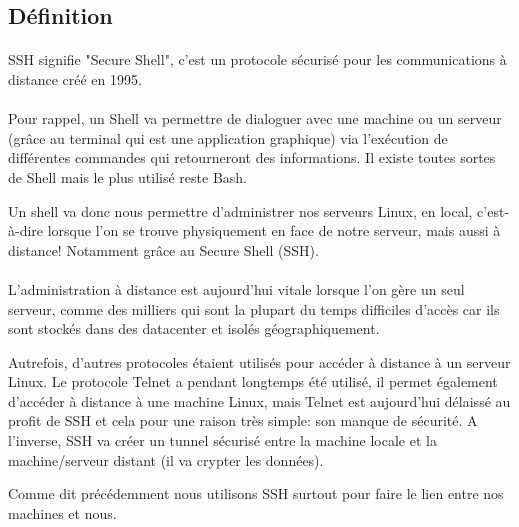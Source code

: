 \subsection{Définition}

\paragraph{} SSH signifie "Secure Shell", c'est un protocole sécurisé pour les
communications à distance créé en 1995.

\paragraph{} Pour rappel, un Shell va permettre de dialoguer avec une machine
ou un serveur (grâce au terminal qui est une application graphique) via
l'exécution de différentes commandes qui retourneront des informations. Il
existe toutes sortes de Shell mais le plus utilisé reste Bash.

Un shell va donc nous permettre d'administrer nos serveurs Linux,
en local, c'est-à-dire lorsque l'on se trouve physiquement en face de notre
serveur, mais aussi à distance! Notamment grâce au Secure Shell (SSH).

\paragraph{} L'administration à distance est aujourd'hui vitale lorsque l'on
gère un seul serveur, comme des milliers qui sont la plupart du temps
difficiles d'accès car ils sont stockés dans des datacenter et isolés
géographiquement.

Autrefois, d'autres protocoles étaient utilisés pour accéder à distance à un
serveur Linux. Le protocole Telnet a pendant longtemps été utilisé, il permet
également d'accéder à distance à une machine Linux, mais Telnet est aujourd'hui
délaissé au profit de SSH et cela pour une raison très simple: son manque de
sécurité. A l'inverse, SSH va créer un tunnel sécurisé entre la machine locale
et la machine/serveur distant (il va crypter les données).

Comme dit précédemment nous utilisons SSH surtout pour faire le lien entre nos
machines et nous.

